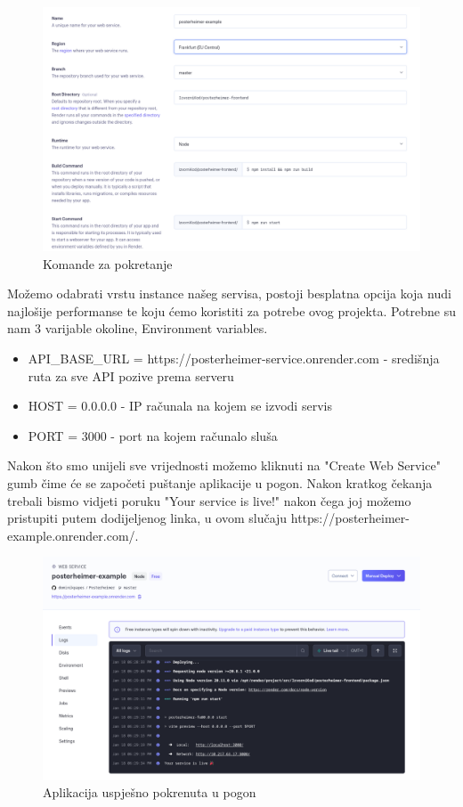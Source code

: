 			\newpage
			\begin{figure} [h]
			\includegraphics[width=\linewidth]{Slike/Run-Commands}
			\caption{Komande za pokretanje}
			\end{figure}
			
			Možemo odabrati vrstu instance našeg servisa, postoji besplatna opcija koja nudi najlošije performanse te koju ćemo koristiti  za potrebe ovog projekta.
			Potrebne su nam 3 varijable okoline, Environment variables.
			
			\begin{itemize}
				\item  API\_BASE\_URL = https://posterheimer-service.onrender.com - središnja ruta za sve API pozive prema serveru
				\item HOST = 0.0.0.0 - IP računala na kojem se izvodi servis
				\item  PORT = 3000 - port na kojem računalo sluša
			\end{itemize}
			
			Nakon što smo unijeli sve vrijednosti možemo kliknuti na "Create Web Service" gumb čime će se započeti puštanje aplikacije u pogon. Nakon kratkog čekanja trebali bismo vidjeti poruku "Your service is live!" nakon čega joj možemo pristupiti putem dodijeljenog linka, u ovom slučaju https://posterheimer-example.onrender.com/.
			
			\newpage
			\begin{figure} [h]
				\includegraphics[width=\linewidth]{Slike/Frontend-Deployed}
				\caption{Aplikacija uspješno pokrenuta u pogon}
			\end{figure}
			\eject 